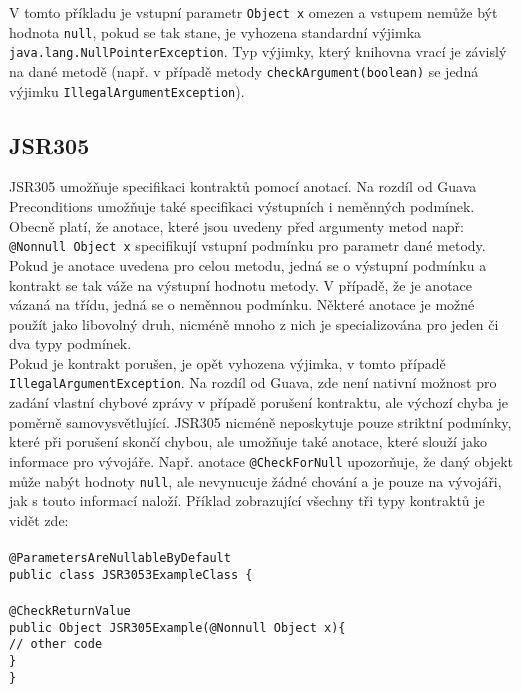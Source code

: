     		V tomto příkladu je vstupní parametr \texttt{Object x} omezen a vstupem nemůže být hodnota \texttt{null}, pokud se tak stane, je vyhozena standardní výjimka \texttt{java.lang.NullPointerException}. Typ výjimky, který knihovna vrací je závislý na dané metodě (např. v případě metody \texttt{checkArgument(boolean)} se jedná výjimku \texttt{IllegalArgumentException}).
		
		
		\subsection{JSR305}
			JSR305 \cite{jsr305} umožňuje specifikaci kontraktů pomocí anotací. Na rozdíl od Guava Preconditions umožňuje také specifikaci výstupních i neměnných podmínek. Obecně platí, že anotace, které jsou uvedeny před argumenty metod např: \texttt{@Nonnull Object x} specifikují vstupní podmínku pro parametr dané metody. Pokud je anotace uvedena pro celou metodu, jedná se o výstupní podmínku a kontrakt se tak váže na výstupní hodnotu metody. V případě, že je anotace vázaná na třídu, jedná se o neměnnou podmínku. Některé anotace je možné použít jako libovolný druh, nicméně mnoho z nich je specializována pro jeden či dva typy podmínek.\\ 
			
			Pokud je kontrakt porušen, je opět vyhozena výjimka, v tomto případě \texttt{IllegalArgumentException}. Na rozdíl od Guava, zde není nativní možnost pro zadání vlastní chybové zprávy v případě porušení kontraktu, ale výchozí chyba je poměrně samovysvětlující. JSR305 nicméně neposkytuje pouze striktní podmínky, které při porušení skončí chybou, ale umožňuje také anotace, které slouží jako informace pro vývojáře. Např. anotace \texttt{@CheckForNull} upozorňuje, že daný objekt může nabýt hodnoty \texttt{null}, ale nevynucuje žádné chování a je pouze na vývojáři, jak s touto informací naloží. Příklad zobrazující všechny tři typy kontraktů je vidět zde:\\\\			
			\- \- \- \- \- \texttt{@ParametersAreNullableByDefault}\\
			\- \- \- \- \- \texttt{public class JSR3053ExampleClass \{}\\\\
   			\- \- \- \- \- \- \- \- \- \- \texttt{@CheckReturnValue}\\
    		\- \- \- \- \- \- \- \- \- \- \texttt{public Object JSR305Example(@Nonnull Object x)\{}\\
      		\- \- \- \- \- \- \- \- \- \- \- \- \- \- \- \texttt{\textcolor{pgrey}{// other code}}\\
    		\- \- \- \- \- \- \- \- \- \- \texttt{\}}\\
			\- \- \- \- \- \texttt{\}}\\
			

